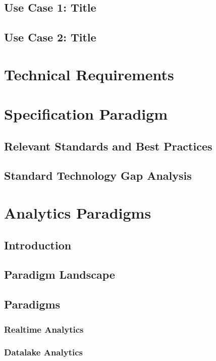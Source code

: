 \documentclass[12pt]{article}
\begin{document}
\subsection{Use Case 1: Title}
\subsection{Use Case 2: Title}


\section{Technical Requirements}

\section{Specification Paradigm}

\subsection{Relevant Standards and Best Practices}
\subsection{Standard Technology Gap Analysis}

\section{Analytics Paradigms}

\subsection{Introduction}

\subsection{Paradigm Landscape}

\subsection{Paradigms}
\subsubsection{Realtime Analytics} 
\subsubsection{Datalake Analytics} 
\end{document}
